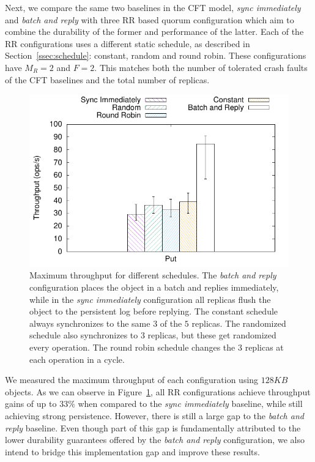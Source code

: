 Next, we compare the same two baselines in the
\ac{CFT} model, \emph{sync immediately} and \emph{batch and reply} with three \ac{RR} based quorum
configuration which aim to combine the durability of the former and
performance of the latter. Each of the \ac{RR} configurations
uses a different static schedule, as described in
Section~\ref{ssec:schedule}: constant, random and round robin.
These configurations have $M_R = 2$ and $F = 2$. This matches
both the number of tolerated crash faults of the \ac{CFT}
baselines and the total number of replicas.


\begin{figure}[t]
    \centering
    \includegraphics[width=.75\linewidth]{r2s2_results/rr_small/tput.pdf}
    \caption{Maximum throughput for different schedules.
    The \emph{batch and reply} configuration places the
    object in a batch and replies immediately, while in the
    \emph{sync immediately} configuration all replicas
    flush the object to the persistent log before replying. The
    constant schedule always synchronizes to the same $3$ of the
    $5$ replicas. The randomized schedule also synchronizes to
    $3$ replicas, but these get randomized every operation. The
    round robin schedule changes the $3$ replicas at each
    operation in a cycle.}\label{fig:r2s2_sched}
\end{figure}

We measured the maximum throughput of each configuration using  $128KB$ objects.
As we can observe in Figure~\ref{fig:r2s2_sched}, all \ac{RR}
configurations achieve throughput gains of up to $33\%$ when compared to the
\emph{sync immediately} baseline, while still achieving strong
persistence. However, there is still a large gap to the
\emph{batch and reply} baseline. Even though part of this gap is fundamentally attributed to the
lower durability guarantees offered by the \emph{batch and reply}
configuration, we also intend to bridge this implementation gap and
improve these results.
